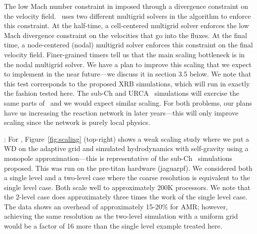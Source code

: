 The low Mach number constraint in imposed through a divergence
constraint on the velocity field.
\maestro\ uses two different multigrid solvers in the algorithm to
enforce this constraint.  At
the half-time, a cell-centered multigrid solver enforces the low Mach
divergence constraint on the velocities that go into the fluxes.  At
the final time, a node-centered (nodal) multigrid solver enforces
this constraint on the final velocity field.
Finer-grained timers tell us that the main scaling bottleneck is in
the nodal multigrid solver.  We have a plan to improve this scaling
that we expect to implement in the near future---we discuss it 
in section 3.5 below.  We note that this test corresponds to the 
proposed XRB simulations, which will run in exactly the fashion
tested here.  The sub-Ch and URCA \maestro\ simulations will exercise the
same parts of \maestro\ and we would expect similar scaling.  For
both problems, our plans have us increasing the reaction network in
later years---this will only improve scaling since the network is purely
local physics.

{\bf \castro}: For \castro, Figure~\ref{fig:scaling} (top-right) shows a
weak scaling study where we put a WD on the adaptive grid and
simulated hydrodynamics with self-gravity using a monopole
approximation---this is representative of the sub-Ch
\castro\ simulations proposed.  This was run on the pre-titan hardware
(jaguarpf).  We considered both a single level and a two-level case
where the coarse resolution is equivalent to the single level case.
Both scale well to approximately 200K processors.  We note that the
2-level case does approximately three times the work of the single
level case.  The data shows an overhead of approximately 15-20\% for
AMR; however, achieving the same resolution as the two-level
simulation with a uniform grid would be a factor of 16 more than the
single level example treated here.

